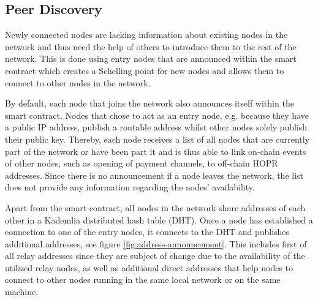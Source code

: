 \subsection{Peer Discovery}
\label{sec:p2p:peer-discovery}

Newly connected nodes are lacking information about existing nodes in the network and thus need the help of others to introduce them to the rest of the network. This is done using entry nodes that are announced within the smart contract which creates a Schelling point for new nodes and allows them to connect to other nodes in the network.

By default, each node that joins the network also announces itself within the smart contract. Nodes that chose to act as an entry node, e.g. because they have a public IP address, publish a routable address whilst other nodes solely publish their public key. Thereby, each node receives a list of all nodes that are currently part of the network or have been part it and is thus able to link on-chain events of other nodes, such as opening of payment channels, to off-chain HOPR addresses. Since there is no announcement if a node leaves the network, the list does not provide any information regarding the nodes' availability.

Apart from the smart contract, all nodes in the network share addresses of each other in a Kademlia \cite{kademlia} distributed hash table (DHT). Once a node has established a connection to one of the entry nodes, it connects to the DHT and publishes additional addresses, see figure \ref{fig:address-announcement}. This includes first of all relay addresses since they are subject of change due to the availability of the utilized relay nodes, as well as additional direct addresses that help nodes to connect to other nodes running in the same local network or on the same machine.

